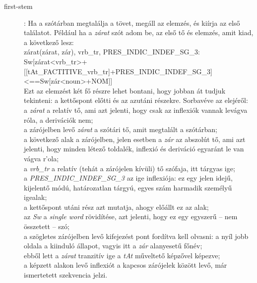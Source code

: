 \documentclass{article}
\begin{document}
\begin{description}

\item[first-stem]: Ha a sz\'ot\'arban megtal\'alja a t\"ovet, meg\'all az elemz\'es, \'es ki\'{i}rja az els\H{o} tal\'alatot. P\'eld\'aul ha a \emph{z\'arat} sz\'ot adom be, az els\H{o} t\H{o} \'es elemz\'es, amit kiad, a k\"ovetkez\H{o} lesz: \\

z\'arat(z\'arat, z\'ar), vrb\_tr, PRES\_INDIC\_INDEF\_SG\_3: Sw[z\'arat<vrb\_tr>+[[tAt\_FACTITIVE\_vrb\_tr]+{PRES\_INDIC\_INDEF\_SG\_3}]<==Sw[z\'ar<noun>+{NOM}]] \\

Ezt az elemz\'est k\'et f\H{o} r\'eszre lehet bontani, hogy jobban \'at tudjuk tekinteni: a kett\H{o}spont el\H{o}tti \'es az azut\'ani r\'eszekre. Sorbav\'eve az elej\'er\H{o}l: \\
a \textit{z\'arat} a relat\'{i}v t\H{o}, ami azt jelenti, hogy csak az inflexi\'ok vannak lev\'agva r\'ola, a deriv\'aci\'ok nem; \\
a z\'ar\'ojelben lev\H{o} \textit{z\'arat} a sz\'ot\'ari t\H{o}, amit megtal\'alt a sz\'ot\'arban; \\
a k\"ovetkez\H{o} alak a z\'ar\'ojelben, jelen esetben a \textit{z\'ar} az abszol\'ut t\H{o}, ami azt jelenti, hogy minden l\'etez\H{o} toldal\'ek, inflexi\'o \'es deriv\'aci\'o egyar\'ant le van v\'agva r'ola; \\
a \textit{vrb\_tr} a relat\'{i}v (teh\'at a z\'ar\'ojelen k\'{i}v\"uli) t\H{o} sz\'ofaja, itt t\'argyas ige; \\
a \textit{PRES\_INDIC\_INDEF\_SG\_3} az ige inflexi\'oja: ez egy jelen idej\H{u}, kijelent\H{o} m\'od\'u, hat\'arozatlan t\'argy\'u, egyes sz\'am harmadik szem\'ely\H{u} igealak; \\
a kett\H{o}spont ut\'ani r\'esz azt mutatja, ahogy el\H{o}\'allt ez az alak; \\
az \textit{Sw} a \textit{single word} r\"ovid\'{i}t\'ese, azt jelenti, hogy ez egy egyszer\H{u} -- nem \"osszetett -- sz\'o; \\
a sz\"ogletes z\'ar\'ojelben lev\H{o} kifejez\'est pont ford\'{i}tva kell olvasni: a ny\'{i}l jobb oldala a kiindul\'o \'allapot, vagyis itt a \textit{z\'ar} alanyeset\H{u} f\H{o}n\'ev; \\
ebb\H{o}l lett a \textit{z\'arat} tranzit\'{i}v ige a \textit{tAt} m\H{u}veltet\H{o} k\'epz\H{o}vel k\'epezve; \\
a k\'epzett alakon lev\H{o} inflexi\'ot a kapcsos z\'ar\'ojelek k\"oz\"ott lev\H{o}, m\'ar ismertetett szekvencia jelzi. \\


\end{description}
\end{document}
